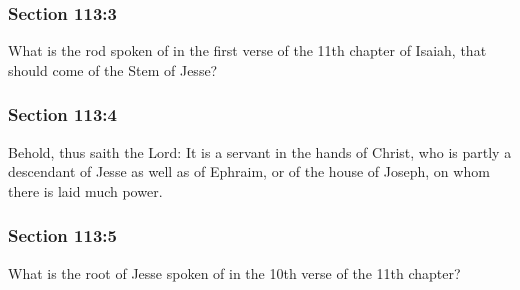 	\subsubsection{Section 113:3} %
		\label{DC113-3}

		What is the rod spoken of in the first verse of the 11th chapter of Isaiah, that should come of the Stem of Jesse?


	\subsubsection{Section 113:4} %
		\label{DC113-4}

		Behold, thus saith the Lord: It is a servant in the hands of Christ, who is partly a descendant of Jesse as well as of Ephraim, or of the house of Joseph, on whom there is laid much power.


	\subsubsection{Section 113:5} %
		\label{DC113-5}

		What is the root of Jesse spoken of in the 10th verse of the 11th chapter?


